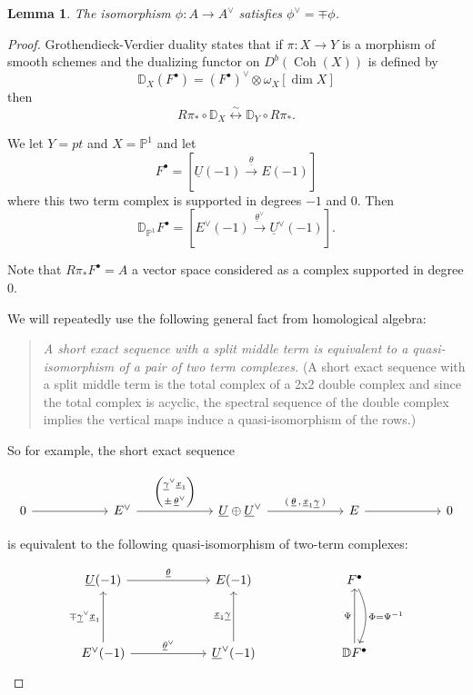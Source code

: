 \documentclass{amsart}
\newtheorem{lemma}[theorem]{Lemma}
\theoremstyle{definition}
\newcommand{\DD} {{\mathbb D}}
\newcommand{\PP}{\mathbb{P}}
\newcommand{\UL}[1]{\underline{#1}}
\newcommand{\homotopyeq}{\overset \sim \longleftrightarrow}
\newcommand{\Rpistar}{R\pi_{*}}
\begin{document}
\begin{lemma}\label{lem: phivee = mp phi}
The  isomorphism $\phi: A \rightarrow A^\vee$ satisfies $\phi^{\vee} = \mp \phi$. 
\end{lemma}
\begin{proof}
Grothendieck-Verdier duality \cite[Eq~3.20]{Huybrechts-FMbook} states
that if $\pi :X\to Y$ is a morphism of smooth schemes and the
dualizing functor on $D^{b}(\operatorname{Coh}(X))$ is defined by 
\[
\DD_{X}(F^{\bullet}) = (F^{\bullet})^{\vee} \otimes \omega_{X}[\dim X ]
\]
then
\[
\Rpistar \circ \DD_{X} \homotopyeq  \DD_{Y}\circ \Rpistar .
\]

We let $Y=pt$ and $X=\PP^{1}$ and let 
\[
F^{\bullet} = [\UL{U}(-1)\stackrel{\UL{\theta}}{\longrightarrow } E(-1)]
\]
where this two term complex is supported in degrees $-1$ and $0$. Then
\[
\DD_{\PP^{1}}F^{\bullet} = [E^{\vee}(-1)\stackrel{\UL{\theta}^{\vee
}}{\longrightarrow } \UL{U}^{\vee}(-1)] .
\]

Note that $\Rpistar F^{\bullet}=A$ a vector space considered as a
complex supported in degree 0.

We will repeatedly use the following general fact from homological
algebra:
\bigskip

\begin{quote}
\emph{A short exact sequence with a split middle term is equivalent to
a quasi-isomorphism of a pair of two term complexes.}  (A short
exact sequence with a split middle term is the total complex of a 2x2
double complex and since the total complex is acyclic, the spectral
sequence of the double complex implies the vertical maps induce a
quasi-isomorphism of the rows.)
\end{quote}
\bigskip

So for example, the short exact sequence

\[
\begin{tikzcd}[column sep=6em]
0 \arrow[r]
& E^{\vee}
  \arrow[r,"{%
    \begin{pmatrix}
      \UL{\gamma}^{\vee}\UL{x}_{1} \\[2pt]
      \pm\,\UL{\theta}^{\vee}
    \end{pmatrix}
  }"]
& \UL{U}\oplus \UL{U}^{\vee}
  \arrow[r,"{(\:\UL{\theta}\,,\,\UL{x}_{1}\UL{\gamma}\:)}"]
& E \arrow[r]
& 0
\end{tikzcd}
\]

is equivalent to the following quasi-isomorphism of two-term complexes:


\[
\begin{tikzcd}[column sep=6em,row sep=4em]
  \UL{U}(-1)
    \arrow[r,"\UL{\theta }"]
  & E(-1)
  & F^{\bullet}
    \arrow[d,bend left=25,"\Phi=\Psi^{-1}   "]\\
  E^{\vee}(-1)
    \arrow[u,"\mp \UL{\gamma}^{\vee}\UL{x}_{1}"]
    \arrow[r,"\UL{\theta }^{\vee}"]
  & \UL{U}^{\vee }(-1)
    \arrow[u,"\UL{x}_{1}\UL{\gamma }"]
  & \DD F^{\bullet}
    \arrow[u,"\Psi  "]
\end{tikzcd}
\]


\end{proof}
\end{document}
